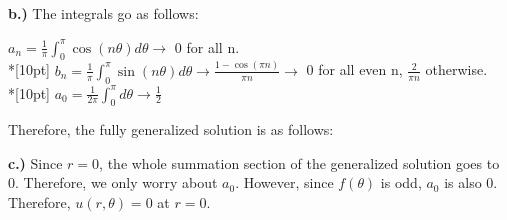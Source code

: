 \documentclass{article}
\begin{document}
\textbf{b.)} The integrals go as follows:
\begin{center}
    \(\displaystyle a_n = \frac{1}{\pi}\int_{0}^{\pi}\cos(n\theta)d\theta\rightarrow\) 0 for all n.\\*[10pt]
    \(\displaystyle b_n = \frac{1}{\pi}\int_{0}^{\pi}\sin(n\theta)d\theta\rightarrow\frac{1 - \cos(\pi n)}{\pi n}\rightarrow\) 0 for all even n, \(\displaystyle\frac{2}{\pi n}\) otherwise.\\*[10pt]
    \(\displaystyle a_0 = \frac{1}{2\pi}\int_{0}^{\pi}d\theta\rightarrow \frac{1}{2}\)
\end{center}
Therefore, the fully generalized solution is as follows:
\begin{center}
\end{center}
\textbf{c.)} Since \(r = 0\), the whole summation section of the generalized solution goes to 0. Therefore, we only worry about \(a_0\). However, since \(f(\theta)\) is odd, \(a_0\) is also 0. Therefore, \(u(r, \theta) = 0\) at \(r = 0\).

\clearpage \noindent
\end{document}
